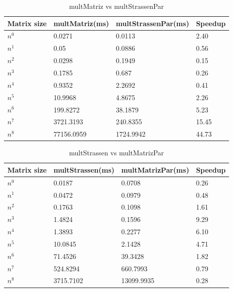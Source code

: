 \documentclass[12pt, a4paper]{article}
\begin{document}
\begin{table}[h]
    \centering
    \begin{tabular}{ | m{2cm} | m{3cm} | m{4cm} | m{3cm} | }
    \hline
    Matrix size & multMatriz(ms) & multStrassenPar(ms) & Speedup \\ 
    \hline
    $n^0$ & 0.0271 & 0.0113 & 2.40 \\
    $n^1$ & 0.05 & 0.0886 & 0.56 \\
    $n^2$ & 0.0298 & 0.1949 & 0.15 \\
    $n^3$ & 0.1785 & 0.687 & 0.26 \\
    $n^4$ & 0.9352 & 2.2692 & 0.41 \\
    $n^5$ & 10.9968 & 4.8675 & 2.26 \\
    $n^6$ & 199.8272 & 38.1879 & 5.23 \\
    $n^7$ & 3721.3193 & 240.8355 & 15.45 \\
    $n^8$ & 77156.0959 & 1724.9942 & 44.73 \\
    \hline
    \end{tabular}
    \caption{multMatriz vs multStrassenPar}
    \label{table:matrix_comparison_strassen_par}
\end{table}

\begin{table}[h]
    \centering
    \begin{tabular}{ | m{2cm} | m{3cm} | m{4cm} | m{3cm} | }
    \hline
    Matrix size & multStrassen(ms) & multMatrizPar(ms) & Speedup \\ 
    \hline
    $n^0$ & 0.0187 & 0.0708 & 0.26 \\
    $n^1$ & 0.0472 & 0.0979 & 0.48 \\
    $n^2$ & 0.1763 & 0.1098 & 1.61 \\
    $n^3$ & 1.4824 & 0.1596 & 9.29 \\
    $n^4$ & 1.3893 & 0.2277 & 6.10 \\
    $n^5$ & 10.0845 & 2.1428 & 4.71 \\
    $n^6$ & 71.4526 & 39.3428 & 1.82 \\
    $n^7$ & 524.8294 & 660.7993 & 0.79 \\
    $n^8$ & 3715.7102 & 13099.9935 & 0.28 \\
    \hline
    \end{tabular}
    \caption{multStrassen vs multMatrizPar}
    \label{table:matrix_comparison_strassen_matrizpar}
\end{table}
\end{document}
